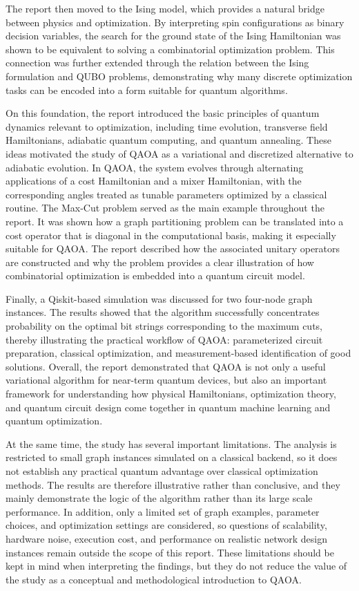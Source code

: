 \documentclass[english,12pt,a4paper]{report}
\begin{document}
	The report then moved to the Ising model, which provides a natural bridge between physics and optimization. By interpreting spin configurations as binary decision variables, the search for the ground state of the Ising Hamiltonian was shown to be equivalent to solving a combinatorial optimization problem. This connection was further extended through the relation between the Ising formulation and QUBO problems, demonstrating why many discrete optimization tasks can be encoded into a form suitable for quantum algorithms.
	
	On this foundation, the report introduced the basic principles of quantum dynamics relevant to optimization, including time evolution, transverse field Hamiltonians, adiabatic quantum computing, and quantum annealing. These ideas motivated the study of QAOA as a variational and discretized alternative to adiabatic evolution. In QAOA, the system evolves through alternating applications of a cost Hamiltonian and a mixer Hamiltonian, with the corresponding angles treated as tunable parameters optimized by a classical routine.
	The Max-Cut problem served as the main example throughout the report. It was shown how a graph partitioning problem can be translated into a cost operator that is diagonal in the computational basis, making it especially suitable for QAOA. The report described how the associated unitary operators are constructed and why the problem provides a clear illustration of how combinatorial optimization is embedded into a quantum circuit model.
	
	Finally, a Qiskit-based simulation was discussed for two four-node graph instances. The results showed that the algorithm successfully concentrates probability on the optimal bit strings corresponding to the maximum cuts, thereby illustrating the practical workflow of QAOA: parameterized circuit preparation, classical optimization, and measurement-based identification of good solutions. Overall, the report demonstrated that QAOA is not only a useful variational algorithm for near-term quantum devices, but also an important framework for understanding how physical Hamiltonians, optimization theory, and quantum circuit design come together in quantum machine learning and quantum optimization.
	
	At the same time, the study has several important limitations. The analysis is restricted to small graph instances simulated on a classical backend, so it does not establish any practical quantum advantage over classical optimization methods. The results are therefore illustrative rather than conclusive, and they mainly demonstrate the logic of the algorithm rather than its large scale performance. In addition, only a limited set of graph examples, parameter choices, and optimization settings are considered, so questions of scalability, hardware noise, execution cost, and performance on realistic network design instances remain outside the scope of this report. These limitations should be kept in mind when interpreting the findings, but they do not reduce the value of the study as a conceptual and methodological introduction to QAOA.
   
\end{document}
